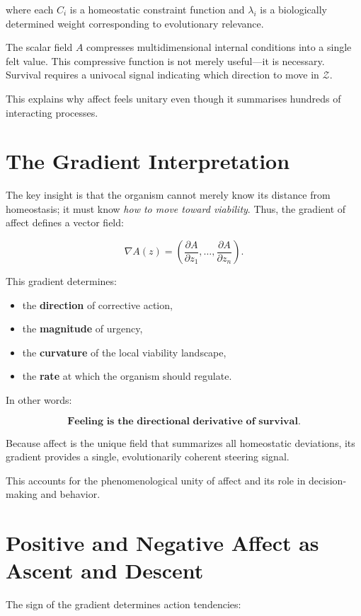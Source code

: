 \documentclass[12pt,oneside]{book}
\theoremstyle{plain}
\theoremstyle{definition}
\begin{document}
where each $C_i$ is a homeostatic constraint function and $\lambda_i$ is a
biologically determined weight corresponding to evolutionary relevance.

The scalar field $A$ compresses multidimensional internal conditions into a
single felt value.
This compressive function is not merely useful—it is necessary.
Survival requires a univocal signal indicating which direction to move in
$\mathcal{Z}$.

This explains why affect feels unitary even though it summarises hundreds of
interacting processes.

\section{The Gradient Interpretation}

The key insight is that the organism cannot merely know its distance from
homeostasis; it must know \emph{how to move toward viability}.
Thus, the gradient of affect defines a vector field:

\[
\nabla A(z) =
\left(
\frac{\partial A}{\partial z_1},
\dots,
\frac{\partial A}{\partial z_n}
\right).
\]

This gradient determines:
\begin{itemize}
    \item the \textbf{direction} of corrective action,
    \item the \textbf{magnitude} of urgency,
    \item the \textbf{curvature} of the local viability landscape,
    \item the \textbf{rate} at which the organism should regulate.
\end{itemize}

In other words:

\[
\textbf{Feeling is the directional derivative of survival.}
\]

Because affect is the unique field that summarizes all homeostatic deviations,
its gradient provides a single, evolutionarily coherent steering signal.

This accounts for the phenomenological unity of affect and its role in
decision-making and behavior.

\section{Positive and Negative Affect as Ascent and Descent}

The sign of the gradient determines action tendencies:
\end{document}
